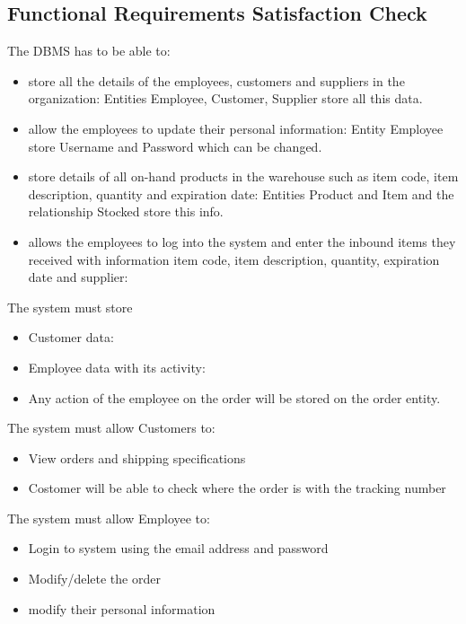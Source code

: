 \subsection{Functional Requirements Satisfaction Check}

The DBMS has to be able to:
\begin{itemize}
\item store all the details of the employees, customers and suppliers in the organization: Entities Employee, Customer, Supplier store all this data.
\item allow the employees to update their personal information: Entity Employee store Username and Password which can be changed.
\item store details of all on-hand products in the warehouse such as item code, item description, quantity and expiration date: Entities Product and Item and the relationship Stocked store this info. 
\item allows the employees to log into the system and enter the inbound items they received with information item code, item description, quantity, expiration date and supplier:
\end{itemize}
The system must store
\begin{itemize}
	\item Customer data:
\end{itemize}
\begin{itemize}
	\item Employee data with its activity:
	\item Any action of the employee on the order will be stored on the order entity.
\end{itemize}

The system must allow Customers to:
\begin{itemize}
	\item View orders and shipping specifications
	\item Costomer will be able to check where the order is with the tracking number
\end{itemize}

The system must allow Employee to:
\begin{itemize}
	\item Login to system using the email address and password
	\item Modify/delete the order
	\item modify their personal information
\end{itemize}